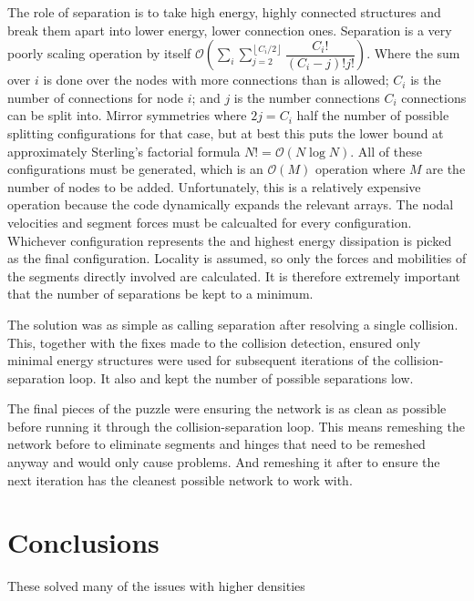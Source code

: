 The role of separation is to take high energy, highly connected structures and break them apart into lower energy, lower connection ones. Separation is a very poorly scaling operation by itself $\mathcal{O}\left(\sum\limits_{i}\sum\limits_{j=2}^{\left\lfloor C_i/2 \right\rfloor} \dfrac{C_i!}{(C_i-j)! j!}\right)$. Where the sum over $i$ is done over the nodes with more connections than is allowed; $C_i$ is the number of connections for node $i$; and $j$ is the number connections $C_i$ connections can be split into. Mirror symmetries where $2j = C_i$ half the number of possible splitting configurations for that case, but at best this puts the lower bound at approximately Sterling's factorial formula $N! = \mathcal{O}(N\log{N})$. All of these configurations must be generated, which is an $\mathcal{O}(M)$ operation where $M$ are the number of nodes to be added. Unfortunately, this is a relatively expensive operation because the code dynamically expands the relevant arrays. The nodal velocities and segment forces must be calcualted for every configuration. Whichever configuration represents the and highest energy dissipation is picked as the final configuration. Locality is assumed, so only the forces and mobilities of the segments directly involved are calculated. It is therefore extremely important that the number of separations be kept to a minimum.

The solution was as simple as calling separation after resolving a single collision. This, together with the fixes made to the collision detection, ensured only minimal energy structures were used for subsequent iterations of the collision-separation loop. It also and kept the number of possible separations low.

The final pieces of the puzzle were ensuring the network is as clean as possible before running it through the collision-separation loop. This means remeshing the network before to eliminate segments and hinges that need to be remeshed anyway and would only cause problems. And remeshing it after to ensure the next iteration has the cleanest possible network to work with.

\section{Conclusions}

These solved many of the issues with higher densities %
\savearabiccounter
